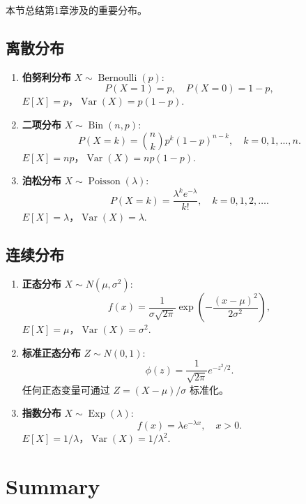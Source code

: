 本节总结第1章涉及的重要分布。

\subsection{离散分布}\label{sub:discrete-distributions-summary}

\begin{enumerate}
    \item \textbf{伯努利分布} $X \sim \operatorname{Bernoulli}(p)$:
    \[
    P(X = 1) = p, \quad P(X = 0) = 1-p,
    \]
    $E[X] = p$，$\operatorname{Var}(X) = p(1-p)$.

    \item \textbf{二项分布} $X \sim \operatorname{Bin}(n, p)$:
    \[
    P(X = k) = \binom{n}{k} p^k (1-p)^{n-k}, \quad k = 0, 1, \ldots, n.
    \]
    $E[X] = np$，$\operatorname{Var}(X) = np(1-p)$.

    \item \textbf{泊松分布} $X \sim \operatorname{Poisson}(\lambda)$:
    \[
    P(X = k) = \frac{\lambda^k e^{-\lambda}}{k!}, \quad k = 0, 1, 2, \ldots.
    \]
    $E[X] = \lambda$，$\operatorname{Var}(X) = \lambda$.
\end{enumerate}

\subsection{连续分布}\label{sub:continuous-distributions-summary}

\begin{enumerate}
    \item \textbf{正态分布} $X \sim N(\mu, \sigma^2)$:
    \[
    f(x) = \frac{1}{\sigma\sqrt{2\pi}} \exp\left(-\frac{(x-\mu)^2}{2\sigma^2}\right),
    \]
    $E[X] = \mu$，$\operatorname{Var}(X) = \sigma^2$.

    \item \textbf{标准正态分布} $Z \sim N(0, 1)$:
    \[
    \phi(z) = \frac{1}{\sqrt{2\pi}} e^{-z^2/2}.
    \]
    任何正态变量可通过 $Z = (X - \mu) / \sigma$ 标准化。

    \item \textbf{指数分布} $X \sim \operatorname{Exp}(\lambda)$:
    \[
    f(x) = \lambda e^{-\lambda x}, \quad x > 0.
    \]
    $E[X] = 1/\lambda$，$\operatorname{Var}(X) = 1/\lambda^2$.
\end{enumerate}

\section*{Summary}\label{sec:chapter1-summary}

